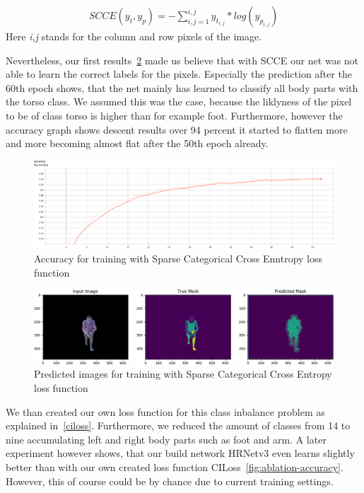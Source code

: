 \begin{align}
    SCCE(y_t,y_p) = -\sum_{i,j=1}^{i,j}y_{t_{i,j}}*log(y_{p_{i,j}})
\end{align}
Here \textit{i,j} stands for the column and row pixels of the image.

Nevertheless, our first results~\ref{fig:cross_entropy_pred_img} made us believe that with SCCE our net was not able to
learn the correct labels for the pixels.
Especially the prediction after the 60th epoch shows, that the net mainly has learned to classify all body parts with the
torso class.
We assumed this was the case, because the liklyness of the pixel to be of class torso is higher than for
example foot.
Furthermore, however the accuracy graph shows descent results over 94 percent it started to flatten more and more becoming
almost flat after the 50th epoch already.
\begin{figure}[H]
    \centering
    \includegraphics[width=\textwidth,height=\textheight,keepaspectratio]{Figures/accuracy_cross_entropy.png}
    \decoRule
    \caption[SCCE: Accuracy]{Accuracy for training with Sparse Categorical Cross Enntropy loss function}
    \label{fig:accuracy_cross_entropy}
\end{figure}
\begin{figure}[H]
    \centering
    \includegraphics[width=\textwidth,height=\textheight,keepaspectratio]{Figures/crossentropy_imgs_prediction_last_epoch.png}
    \decoRule
    \caption[SCCE: predictions]{Predicted images for training with Sparse Categorical Cross Entropy loss function}
    \label{fig:cross_entropy_pred_img}
\end{figure}
We than created our own loss function for this class inbalance problem as explained in~\autoref{ciloss}.
Furthermore, we reduced the amount of classes from 14 to nine accumulating left and right body parts such as foot and arm.
A later experiment however shows, that our build network HRNetv3 even learns slightly better than with our own created
loss function CILoss~\ref{fig:ablation-accuracy}.
However, this of course could be by chance due to current training settings.


